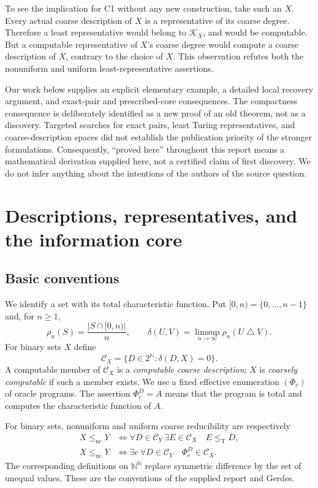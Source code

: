 \documentclass[11pt,a4paper]{article}
\newcommand{\N}{\mathbb N}
\newcommand{\Cantor}{2^{\N}}
\newcommand{\Baire}{\N^{\N}}
\newcommand{\leT}{\leq_{\mathrm T}}
\newcommand{\nc}{\mathrm{nc}}
\newcommand{\uc}{\mathrm{uc}}
\newcommand{\CD}[1]{\mathcal C_{#1}}
\newcommand{\Core}[1]{\mathcal K_{#1}}
\newcommand{\sdelta}{\mathbin{\triangle}}
\theoremstyle{definition}\newtheorem{definition}[theorem]{Definition}
\theoremstyle{remark}\newtheorem{remark}[theorem]{Remark}
\begin{document}
To see the implication for C1 without any new construction, take such an $X$. Every actual coarse description of $X$ is a representative of its coarse degree. Therefore a least representative would belong to $\Core X$, and would be computable. But a computable representative of $X$'s coarse degree would compute a coarse description of $X$, contrary to the choice of $X$. This observation refutes both the nonuniform and uniform least-representative assertions.

Our work below supplies an explicit elementary example, a detailed local recovery argument, and exact-pair and prescribed-core consequences. The compactness consequence is deliberately identified as a new proof of an old theorem, not as a discovery. Targeted searches for exact pairs, least Turing representatives, and coarse-description spaces did not establish the publication priority of the stronger formulations. Consequently, ``proved here'' throughout this report means a mathematical derivation supplied here, not a certified claim of first discovery. We do not infer anything about the intentions of the authors of the source question.

\section{Descriptions, representatives, and the information core}
\label{sec:definitions}
\subsection{Basic conventions}
We identify a set with its total characteristic function. Put $[0,n)=\{0,\ldots,n-1\}$ and, for $n\ge1$,
\[
 \rho_n(S)=\frac{|S\cap[0,n)|}{n},\qquad
 \delta(U,V)=\limsup_{n\to\infty}\rho_n(U\sdelta V).
\]
For binary sets $X$ define
\[
 \CD X=\{D\in\Cantor:\delta(D,X)=0\}.
\]
A computable member of $\CD X$ is a \emph{computable coarse description}; $X$ is \emph{coarsely computable} if such a member exists. We use a fixed effective enumeration $(\Phi_e)$ of oracle programs. The assertion $\Phi_e^D=A$ means that the program is total and computes the characteristic function of $A$.

For binary sets, nonuniform and uniform coarse reducibility are respectively
\begin{align*}
 X\le_{\nc}Y
 &\iff \forall D\in\CD Y\ \exists E\in\CD X\quad E\leT D,\\
 X\le_{\uc}Y
 &\iff \exists e\ \forall D\in\CD Y\quad \Phi_e^D\in\CD X.
\end{align*}
The corresponding definitions on $\Baire$ replace symmetric difference by the set of unequal values. These are the conventions of the supplied report and Gerdes.\cite[Section 5]{Input}\cite[Definitions 2.3--2.4]{Gerdes}
\end{document}
